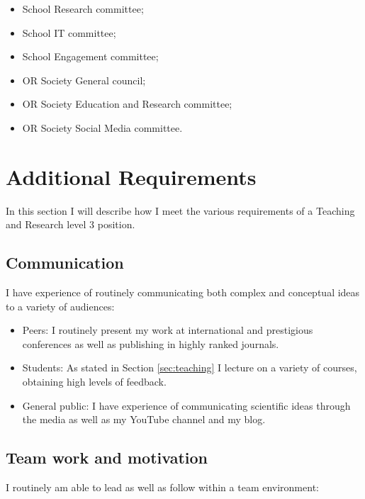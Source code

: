 \documentclass{article}
\begin{document}
\begin{itemize}
    \item School Research committee;
    \item School IT committee;
    \item School Engagement committee;
    \item OR Society General council;
    \item OR Society Education and Research committee;
    \item OR Society Social Media committee.
\end{itemize}

\section{Additional Requirements}\label{sec:additional}

In this section I will describe how I meet the various requirements of a Teaching and Research level 3 position.

\subsection{Communication}

I have experience of routinely communicating both complex and conceptual ideas to a variety of audiences:

\begin{itemize}
    \item Peers: I routinely present my work at international and prestigious conferences as well as publishing in highly ranked journals.
    \item Students: As stated in Section \ref{sec:teaching} I lecture on a variety of courses, obtaining high levels of feedback.
    \item General public: I have experience of communicating scientific ideas through the media as well as my YouTube channel and my blog.
\end{itemize}

\subsection{Team work and motivation}

I routinely am able to lead as well as follow within a team environment:
\end{document}
